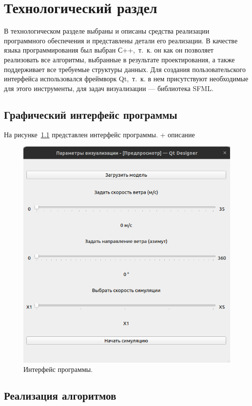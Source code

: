 \chapter{Технологический раздел}

В технологическом разделе выбраны и описаны средства реализации программного обеспечения и представлены детали его реализации.
В качестве языка программирования был выбран С++,~т.~к. он 
как он позволяет реализовать все алгоритмы, выбранные в результате проектирования, а также поддерживает все требуемые структуры данных. Для создания пользовательского интерфейса использовался фреймворк Qt,~т.~к. в нем присутствуют необходимые для этого инструменты, для задач визуализации --- библиотека SFML.

\section{Графический интерфейс программы}
На рисунке~\ref{fig:interface} представлен интерфейс программы. + описание
\begin{figure}[H]
	\centering
	\includegraphics[width=1.0\textwidth, page=1]{assets/img/interface.png}   
	\caption{Интерфейс программы.}
	\label{fig:interface}
\end{figure}
\section{Реализация алгоритмов}

